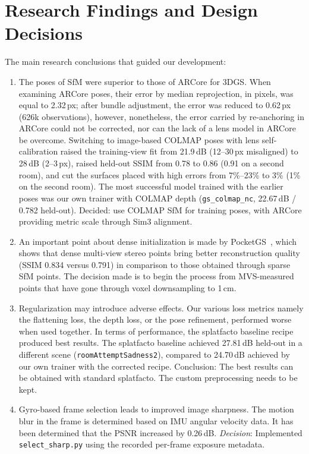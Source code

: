 \section{Research Findings and Design Decisions}
The main research conclusions that guided our development:

\begin{enumerate}
    \item The poses of SfM were superior to those of ARCore for 3DGS. When examining ARCore poses, their error by median reprojection, in pixels, was equal to 2.32\,px; after bundle adjustment, the error was reduced to 0.62\,px (626k observations), however, nonetheless, the error carried by re-anchoring in ARCore could not be corrected, nor can the lack of a lens model in ARCore be overcome. Switching to image-based COLMAP poses with lens self-calibration raised the training-view fit from 21.9\,dB (12--30\,px misaligned) to 28\,dB (2--3\,px), raised held-out SSIM from 0.78 to 0.86 (0.91 on a second room), and cut the surfaces placed with high errors from 7\%--23\% to 3\% (1\% on the second room). The most successful model trained with the earlier poses was our own trainer with COLMAP depth (\texttt{gs\_colmap\_nc}, 22.67\,dB / 0.782 held-out). Decided: use COLMAP SfM for training poses, with ARCore providing metric scale through Sim3 alignment.

    \item An important point about dense initialization is made by PocketGS~\cite{pocketgs}, which shows that dense multi-view stereo points bring better reconstruction quality (SSIM 0.834 versus 0.791) in comparison to those obtained through sparse SfM points. The decision made is to begin the process from MVS-measured points that have gone through voxel downsampling to 1\,cm.

    \item Regularization may introduce adverse effects. Our various loss metrics namely the flattening loss, the depth loss, or the pose refinement, performed worse when used together. In terms of performance, the splatfacto baseline recipe produced best results. The splatfacto baseline achieved 27.81\,dB held-out in a different scene (\texttt{roomAttemptSadness2}), compared to 24.70\,dB achieved by our own trainer with the corrected recipe. Conclusion: The best results can be obtained with standard splatfacto. The custom preprocessing needs to be kept.

    \item Gyro-based frame selection leads to improved image sharpness. The motion blur in the frame is determined based on IMU angular velocity data. It has been determined that the PSNR increased by 0.26\,dB. \emph{Decision}: Implemented \texttt{select\_sharp.py} using the recorded per-frame exposure metadata.
\end{enumerate}

